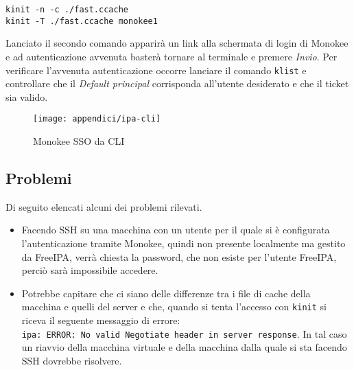 \begin{verbatim}
kinit -n -c ./fast.ccache
kinit -T ./fast.ccache monokee1
\end{verbatim}

Lanciato il secondo comando apparirà un link alla schermata di login di
Monokee e ad autenticazione avvenuta basterà tornare al terminale e
premere \emph{Invio}. Per verificare l'avvenuta autenticazione occorre
lanciare il comando \texttt{klist} e controllare che il \emph{Default
principal} corrisponda all'utente desiderato e che il ticket sia valido.

\begin{figure}[!h] 
  \centering 
  \texttt{[image: appendici/ipa-cli]} 
  \caption{Monokee SSO da CLI}
\end{figure}


\hypertarget{problemi}{%
\subsection{Problemi}\label{problemi}}

Di seguito elencati alcuni dei problemi rilevati.

\begin{itemize}
\item
  Facendo SSH su una macchina con un utente per il quale si è
  configurata l'autenticazione tramite Monokee, quindi non presente
  localmente ma gestito da FreeIPA, verrà chiesta la password, che non
  esiste per l'utente FreeIPA, perciò sarà impossibile accedere.
\item
  Potrebbe capitare che ci siano delle differenze tra i file di cache
  della macchina e quelli del server e che, quando si tenta l'accesso
  con \texttt{kinit} si riceva il seguente messaggio di errore:
  \texttt{ipa:\ ERROR:\ No\ valid\ Negotiate\ header\ in\ server\ response}.
  In tal caso un riavvio della macchina virtuale e della macchina dalla
  quale si sta facendo SSH dovrebbe risolvere.
\end{itemize}


